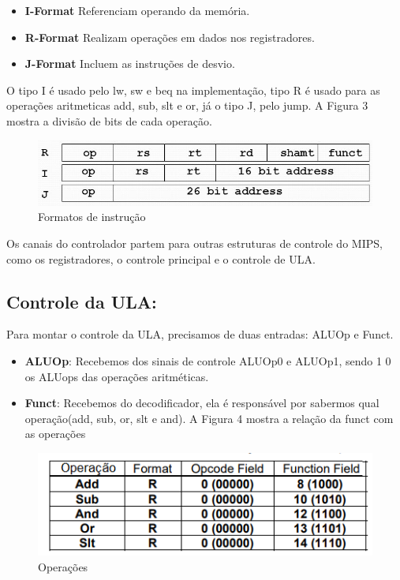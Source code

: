 \documentclass[
	article,
	11pt,
	oneside,
	a4paper,
	english,
	brazil,
	]{abntex2}
\begin{document}
\begin{itemize}
    \item \textbf{I-Format} Referenciam operando da memória.
    \item \textbf{R-Format} Realizam operações em dados nos registradores.
     \item \textbf{J-Format} Incluem as instruções de desvio.
\end{itemize}

O tipo I é usado pelo lw, sw e beq na implementação, tipo R é usado para as operações aritmeticas add, sub, slt e or, já o tipo J, pelo jump. A Figura 3 mostra a divisão de bits de cada operação.

        \begin{figure}[!htb]
        \centering
        \includegraphics[scale=0.5]{imagens/FormatosInstrucao.png}
        \caption{Formatos de instrução}
        \label{fig:hostnetid}
        \end{figure}

Os canais do controlador partem para outras estruturas de controle do MIPS, como os registradores, o controle principal e o controle de ULA. 


\subsection{Controle da ULA:}

Para montar o controle da ULA, precisamos de duas entradas: ALUOp e Funct.
\begin{itemize}
  \item \textbf{ALUOp}: Recebemos dos sinais de controle ALUOp0 e ALUOp1, sendo 1 0 os ALUops das operações aritméticas. 
   \item \textbf{Funct}: Recebemos do decodificador, ela é responsável por sabermos qual operação(add, sub, or, slt e and). A Figura 4 mostra a relação da funct com as operações
\end{itemize}
        \begin{figure}[!htb]
        \centering
        \includegraphics[scale=1.0]{imagens/operações.png}
        \caption{Operações}
        \label{fig:hostnetid}
        \end{figure}
\end{document}
